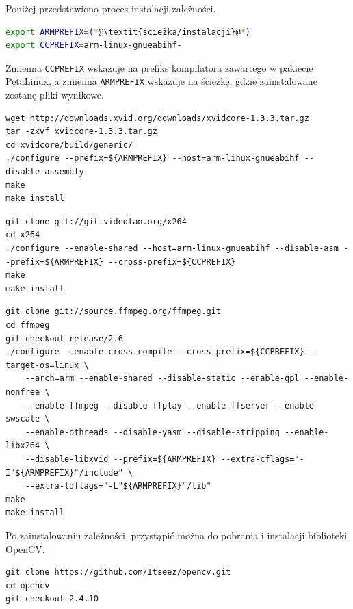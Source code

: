 {Poniżej przedstawiono proces instalacji zależności.

\begin{lstlisting}[breaklines=true, language=Bash, caption=Definicja zmiennych środowiskowych.]
export ARMPREFIX=(*@\textit{ścieżka/instalacji}@*)
export CCPREFIX=arm-linux-gnueabihf-
\end{lstlisting}
Zmienna \texttt{CCPREFIX} wskazuje na prefiks kompilatora zawartego w pakiecie PetaLinux, a zmienna \texttt{ARMPREFIX} wskazuje na ścieżkę, gdzie zainstalowane zostanę pliki wynikowe.

\begin{lstlisting}[breaklines=true, caption=Kompilacja biblioteki \textit{xVideo}.]
wget http://downloads.xvid.org/downloads/xvidcore-1.3.3.tar.gz
tar -zxvf xvidcore-1.3.3.tar.gz
cd xvidcore/build/generic/
./configure --prefix=${ARMPREFIX} --host=arm-linux-gnueabihf --disable-assembly
make
make install
\end{lstlisting}

\begin{lstlisting}[breaklines=true, caption=Kompilacja biblioteki \textit{x264}.]
git clone git://git.videolan.org/x264
cd x264
./configure --enable-shared --host=arm-linux-gnueabihf --disable-asm --prefix=${ARMPREFIX} --cross-prefix=${CCPREFIX}
make
make install
\end{lstlisting}

\begin{lstlisting}[breaklines=true, caption=Kompilacja biblioteki \textit{ffmpeg}.]
git clone git://source.ffmpeg.org/ffmpeg.git
cd ffmpeg
git checkout release/2.6
./configure --enable-cross-compile --cross-prefix=${CCPREFIX} --target-os=linux \
	--arch=arm --enable-shared --disable-static --enable-gpl --enable-nonfree \
	--enable-ffmpeg --disable-ffplay --enable-ffserver --enable-swscale \
	--enable-pthreads --disable-yasm --disable-stripping --enable-libx264 \
	--disable-libxvid --prefix=${ARMPREFIX} --extra-cflags="-I"${ARMPREFIX}"/include" \
	--extra-ldflags="-L"${ARMPREFIX}"/lib"
make
make install
\end{lstlisting}

Po zainstalowaniu zależności, przystąpić można do pobrania i instalacji biblioteki OpenCV.

\begin{lstlisting}[breaklines=true, caption=Pobieranie biblioteki OpenCV w wersji 2.4.10.]
git clone https://github.com/Itseez/opencv.git
cd opencv
git checkout 2.4.10
\end{lstlisting}

}
